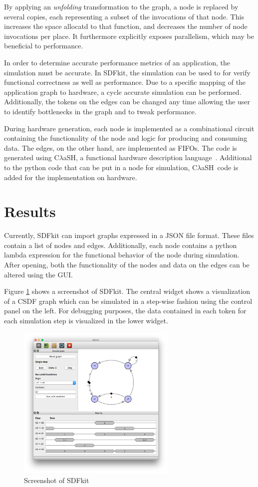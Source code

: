 \documentclass[journal]{IEEEtran}
\newcommand{\clash}{C$\lambda$aSH}
\begin{document}
  By applying an \emph{unfolding} transformation to the graph, a node is replaced by several copies, each representing a subset of the invocations of that node.
  This increases the space allocatd to that function, and decreases the number of node invocations per place.
  It furthermore explicitly exposes parallelism, which may be beneficial to performance.
  
  In order to determine accurate performance metrics of an application, the simulation must be accurate.
  In SDFkit, the simulation can be used to for verify functional correctness as well as performance.
  Due to a specific mapping of the application graph to hardware, a cycle accurate simulation can be performed.
  Additionally, the tokens on the edges can be changed any time allowing the user to identify bottlenecks in the graph and to tweak performance.
  
  During hardware generation, each node is implemented as a combinational circuit containing the functionality of the node and logic for producing and consuming data.
  The edges, on the other hand, are implemented as FIFOs.
  The code is generated using \clash, a functional hardware description language~\cite{Baaij10}.
  Additional to the python code that can be put in a node for simulation, \clash\ code is added for the implementation on hardware.


\section{Results}
\label{sec:results}

  Currently, SDFkit can import graphs expressed in a JSON file format.
  These files contain a list of nodes and edges.
  Additionally, each node contains a python lambda expression for the functional behavior of the node during simulation.
  After opening, both the functionality of the nodes and data on the edges can be altered using the GUI.

  Figure \ref{fig:screenshot} shows a screenshot of SDFkit.
  The central widget shows a visualization of a CSDF graph which can be simulated in a step-wise fashion using the control panel on the left.
  For debugging purposes, the data contained in each token for each simulation step is visualized in the lower widget.

  \begin{figure}[h!]
    \centering
    \includegraphics[width=3in]{screenshot.png}
    \caption{Screenshot of SDFkit}
    \label{fig:screenshot}
  \end{figure}
\end{document}
